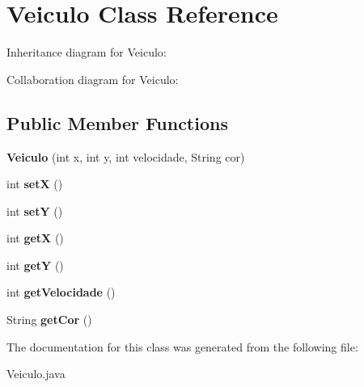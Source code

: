 \hypertarget{classVeiculo}{}\section{Veiculo Class Reference}
\label{classVeiculo}


Inheritance diagram for Veiculo\+:


Collaboration diagram for Veiculo\+:
\subsection*{Public Member Functions}
\begin{DoxyCompactItemize}
\item 
\mbox{\label{classVeiculo_a56a53987094d52940568e14b9a6f4684}} 
{\bfseries Veiculo} (int x, int y, int velocidade, String cor)
\item 
\mbox{\label{classVeiculo_a28cf763354cb7f3d14272c9e793db57e}} 
int {\bfseries setX} ()
\item 
\mbox{\label{classVeiculo_ac0356427caf9839b90e558c99c09395f}} 
int {\bfseries setY} ()
\item 
\mbox{\label{classVeiculo_a235b29e1e25ec8c769b20fb2aeba8404}} 
int {\bfseries getX} ()
\item 
\mbox{\label{classVeiculo_a06b2a923e51186673a016f75d10363d3}} 
int {\bfseries getY} ()
\item 
\mbox{\label{classVeiculo_a29ede179017c05f28aebf02922a5478b}} 
int {\bfseries get\+Velocidade} ()
\item 
\mbox{\label{classVeiculo_ad1df848daf28895b13071d6dec374480}} 
String {\bfseries get\+Cor} ()
\end{DoxyCompactItemize}


The documentation for this class was generated from the following file\+:\begin{DoxyCompactItemize}
\item 
Veiculo.\+java\end{DoxyCompactItemize}
